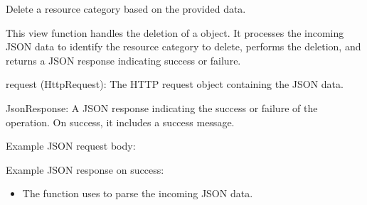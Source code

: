 \documentclass[letterpaper,10pt,english]{sphinxmanual}
\begin{document}

\begin{fulllineitems}
\label{\detokenize{app:app.views.delete_ressourceCategory}}
\pysigstartsignatures
{}
\pysigstopsignatures
\sphinxAtStartPar
Delete a resource category based on the provided data.

\sphinxAtStartPar
This view function handles the deletion of a  object. It processes 
the incoming JSON data to identify the resource category to delete, performs the deletion, 
and returns a JSON response indicating success or failure.
\begin{description}
\sphinxAtStartPar
request (HttpRequest): The HTTP request object containing the JSON data.

\sphinxAtStartPar
JsonResponse: A JSON response indicating the success or failure of the operation. 
On success, it includes a success message.

\sphinxAtStartPar
Example JSON request body:

\begin{sphinxVerbatim}[commandchars=\\\{\}]
\end{sphinxVerbatim}

\sphinxAtStartPar
Example JSON response on success:

\begin{sphinxVerbatim}[commandchars=\\\{\}]
\end{sphinxVerbatim}

\begin{itemize}
\item {} 
\sphinxAtStartPar
The function uses  to parse the incoming JSON data.


\end{itemize}
\end{description}
\end{fulllineitems}
\end{document}
